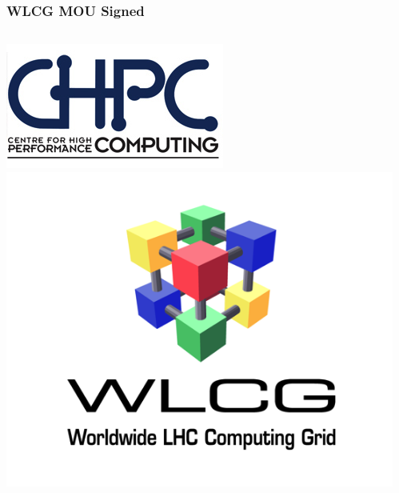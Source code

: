 \documentclass{beamer}
\begin{document}
\begin{frame}
\frametitle{WLCG MOU Signed}
\begin{columns}[T] %
\begin{column}{.48\textwidth}
  \includegraphics[scale=0.45]{CHPCLogo.pdf}
  \includegraphics[scale=0.45]{WLCGLogo.pdf}
\end{column}%
\begin{column}{.48\textwidth}
\end{column}%
\end{columns}  
\end{frame}
\end{document}
